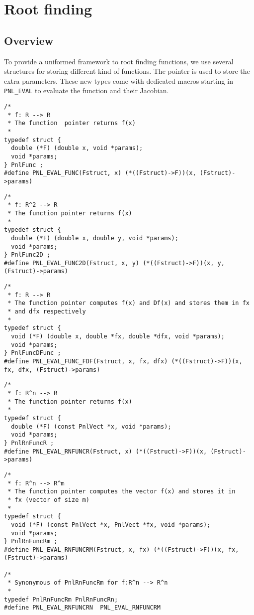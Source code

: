 \section{Root finding}
\subsection{Overview}
\label{sec:PnlFunc}

To provide a uniformed framework to root finding functions, we use several
structures for storing different kind of functions. The pointer
 is used to store the extra parameters. These new types come
with dedicated macros starting in \verb!PNL_EVAL!  to evaluate the function
and their Jacobian.
\begin{lstlisting}
/*
 * f: R --> R
 * The function  pointer returns f(x)
 *
typedef struct {
  double (*F) (double x, void *params);
  void *params;
} PnlFunc ;
#define PNL_EVAL_FUNC(Fstruct, x) (*((Fstruct)->F))(x, (Fstruct)->params)
\end{lstlisting}

\begin{lstlisting}
/*
 * f: R^2 --> R
 * The function pointer returns f(x)
 *
typedef struct {
  double (*F) (double x, double y, void *params);
  void *params;
} PnlFunc2D ;
#define PNL_EVAL_FUNC2D(Fstruct, x, y) (*((Fstruct)->F))(x, y, (Fstruct)->params)
\end{lstlisting}

\begin{lstlisting}
/*
 * f: R --> R
 * The function pointer computes f(x) and Df(x) and stores them in fx
 * and dfx respectively
 *
typedef struct {
  void (*F) (double x, double *fx, double *dfx, void *params);
  void *params;
} PnlFuncDFunc ;
#define PNL_EVAL_FUNC_FDF(Fstruct, x, fx, dfx) (*((Fstruct)->F))(x, fx, dfx, (Fstruct)->params)
\end{lstlisting}

\begin{lstlisting}
/*
 * f: R^n --> R
 * The function pointer returns f(x)
 *
typedef struct {
  double (*F) (const PnlVect *x, void *params);
  void *params;
} PnlRnFuncR ;
#define PNL_EVAL_RNFUNCR(Fstruct, x) (*((Fstruct)->F))(x, (Fstruct)->params)
\end{lstlisting}

\begin{lstlisting}
/*
 * f: R^n --> R^m
 * The function pointer computes the vector f(x) and stores it in
 * fx (vector of size m)
 *
typedef struct {
  void (*F) (const PnlVect *x, PnlVect *fx, void *params);
  void *params;
} PnlRnFuncRm ;
#define PNL_EVAL_RNFUNCRM(Fstruct, x, fx) (*((Fstruct)->F))(x, fx, (Fstruct)->params)

/*
 * Synonymous of PnlRnFuncRm for f:R^n --> R^n
 *
typedef PnlRnFuncRm PnlRnFuncRn;
#define PNL_EVAL_RNFUNCRN  PNL_EVAL_RNFUNCRM
\end{lstlisting}

